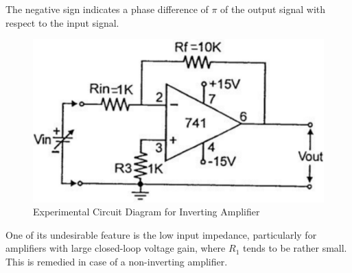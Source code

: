 The negative sign indicates a phase difference of $\pi$ of the output signal with respect to the input signal.


    

\begin{figure}[H]
    \centering
    \includegraphics[width=0.8\columnwidth]{images/inv3.png}
    \caption{Experimental Circuit Diagram for Inverting Amplifier}
    \label{inv3}
\end{figure}

One of its undesirable feature is the low input impedance, particularly for amplifiers with large closed-loop voltage gain, where $R_1$ tends to be rather small. This is remedied in case of a non-inverting amplifier. 

